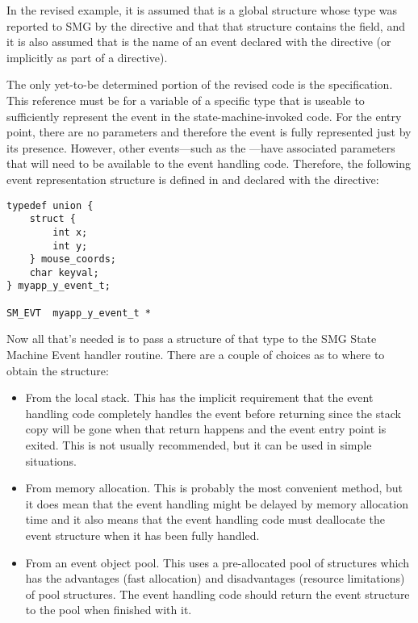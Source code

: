 In the revised example, it is assumed
that {\bf {}} is a global structure whose type was
reported to SMG by the \SMOBJ directive and that that structure
contains the  field, and it is also assumed that {\bf
  } is the name of an event declared with the \EVENT
directive (or implicitly as part of a \TRANS directive).

The only yet-to-be determined portion of the revised code is the
 specification.  This reference must be for a variable
of a specific type that is useable to sufficiently represent the event
in the state-machine-invoked code.  For the 
entry point, there are no parameters and therefore the event is fully
represented just by its presence.  However, other events---such as the
---have associated parameters that will need to be
available to the event handling code.  Therefore, the following event
representation structure is defined in  and declared with
the \SMEVT directive:

\begin{verbatim}
typedef union {
    struct {
        int x;
        int y;
    } mouse_coords;
    char keyval;
} myapp_y_event_t;

SM_EVT  myapp_y_event_t *
\end{verbatim}

Now all that's needed is to pass a structure of that type to the SMG
State Machine Event handler routine.  There are a couple of choices as
to where to obtain the structure:

\begin{itemize}

\item From the local stack.  This has the implicit requirement that the
event handling code completely handles the event before returning since
the stack copy will be gone when that return happens and the event entry
point is exited.  This is not usually recommended, but it can be used
in simple situations.

\item From memory allocation.  This is probably the most convenient
method, but it does mean that the event handling might be delayed by
memory allocation time and it also means that the event handling code
must deallocate the event structure when it has been fully handled.

\item From an event object pool.  This uses a pre-allocated pool of
structures which has the advantages (fast allocation) and disadvantages
(resource limitations) of pool structures.  The event handling code
should return the event structure to the pool when finished with it.

\end{itemize}

